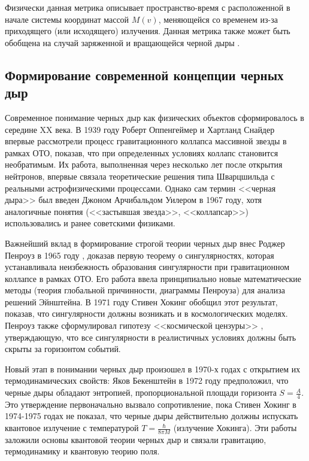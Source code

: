 Физически данная метрика описывает пространство-время с расположенной в начале системы координат массой \(M(v)\), меняющейся со временем из-за приходящего (или исходящего) излучения. Данная метрика также может быть обобщена на случай заряженной и вращающейся черной дыры \cite{poissonRelativistsToolkitMathematics2004}.

\subsection{Формирование современной концепции черных дыр}\label{sub:1.1.2}
Современное понимание черных дыр как физических объектов сформировалось в середине XX века. В 1939 году Роберт Оппенгеймер и Хартланд Снайдер \cite{oppenheimerContinuedGravitationalContraction1939} впервые рассмотрели процесс гравитационного коллапса массивной звезды в рамках ОТО, показав, что при определенных условиях коллапс становится необратимым. Их работа, выполненная через несколько лет после открытия нейтронов, впервые связала теоретические решения типа Шварцшильда с реальными астрофизическими процессами. Однако сам термин <<черная дыра>> был введен Джоном Арчибальдом Уилером в 1967 году, хотя аналогичные понятия (<<застывшая звезда>>, <<коллапсар>>) использовались и ранее советскими физиками.

Важнейший вклад в формирование строгой теории черных дыр внес Роджер Пенроуз в 1965 году \cite{penroseGravitationalCollapseSpaceTime1965a}, доказав первую теорему о сингулярностях, которая устанавливала неизбежность образования сингулярности при гравитационном коллапсе в рамках ОТО. Его работа ввела принципиально новые математические методы (теория глобальной причинности, диаграммы Пенроуза) для анализа решений Эйнштейна. В 1971 году Стивен Хокинг \cite{SingularitiesGravitationalCollapse1970} обобщил этот результат, показав, что сингулярности должны возникать и в космологических моделях. Пенроуз также сформулировал гипотезу <<космической цензуры>> \cite{penroseGravitationalCollapseRole1969}, утверждающую, что все сингулярности в реалистичных условиях должны быть скрыты за горизонтом событий.

Новый этап в понимании черных дыр произошел в 1970-х годах с открытием их термодинамических свойств: Яков Бекенштейн в 1972 году \cite{bekensteinBlackHolesEntropy1973} предположил, что черные дыры обладают энтропией, пропорциональной площади горизонта \(S = \frac{A}{4}\). Это утверждение первоначально вызвало сопротивление, пока Стивен Хокинг в 1974-1975 годах \cite{hawkingParticleCreationBlack1975} не показал, что черные дыры действительно должны испускать квантовое излучение с температурой \(T = \frac{\hbar}{8\pi M}\) (излучение Хокинга). Эти работы заложили основы квантовой теории черных дыр и связали гравитацию, термодинамику и квантовую теорию поля.

